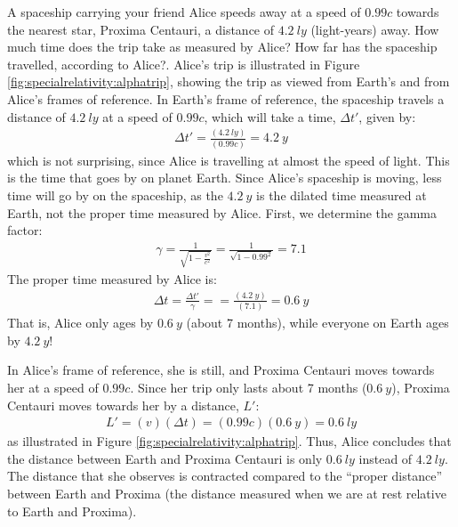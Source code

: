 \begin{example}{\label{ex:specialrelativity:alphatrip}A spaceship carrying your friend Alice speeds away at a speed of $0.99c$ towards the nearest star, Proxima Centauri, a distance of $\SI{4.2}{ly}$ (light-years) away. How much time does the trip take as measured by Alice? How far has the spaceship travelled, according to Alice?.}
Alice's trip is illustrated in Figure \ref{fig:specialrelativity:alphatrip}, showing the trip as viewed from Earth's and from Alice's frames of reference.
In Earth's frame of reference, the spaceship travels a distance of $\SI{4.2}{ly}$ at a speed of $0.99c$, which will take a time, $\Delta t'$, given by:
\begin{align*}
\Delta t' = \frac{(\SI{4.2}{ly})}{(0.99c)}=\SI{4.2}{y}
\end{align*}
which is not surprising, since Alice is travelling at almost the speed of light. This is the time that goes by on planet Earth. Since Alice's spaceship is moving, less time will go by on the spaceship, as the $\SI{4.2}{y}$ is the dilated time measured at Earth, not the proper time measured by Alice. First, we determine the gamma factor:
\begin{align*}
\gamma = \frac{1}{\sqrt{1-\frac{v^2}{c^2}}} =\frac{1}{\sqrt{1-0.99^2}}=7.1
\end{align*}
The proper time measured by Alice is:
\begin{align*}
\Delta t = \frac{\Delta t'}{\gamma}==\frac{(\SI{4.2}{y})}{(7.1)}=\SI{0.6}{y}
\end{align*}
That is, Alice only ages by $\SI{0.6}{y}$ (about 7 months), while everyone on Earth ages by $\SI{4.2}{y}$!

In Alice's frame of reference, she is still, and Proxima Centauri moves towards her at a speed of $0.99c$. Since her trip only lasts about 7 months ($\SI{0.6}{y}$), Proxima Centauri moves towards her by a distance, $L'$:
\begin{align*}
L'=(v)(\Delta t)=(0.99c)(\SI{0.6}{y})=\SI{0.6}{ly}
\end{align*}
as illustrated in Figure \ref{fig:specialrelativity:alphatrip}. Thus, Alice concludes that the distance between Earth and Proxima Centauri is only $\SI{0.6}{ly}$ instead of $\SI{4.2}{ly}$. The distance that she observes is contracted compared to the ``proper distance'' between Earth and Proxima (the distance measured when we are at rest relative to Earth and Proxima).


\end{example}
